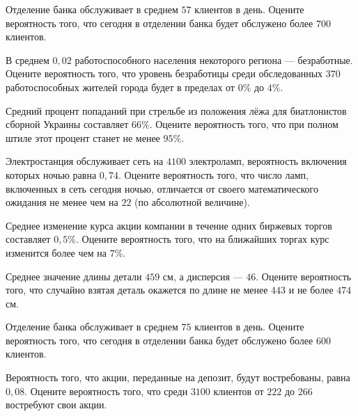 

\z Отделение банка обслуживает в среднем $ 57 $ клиентов в день. Оцените вероятность того, что сегодня в отделении банка будет обслужено более $ 700 $ клиентов.


\vfill

\z В среднем $ 0{,}02 $ работоспособного населения некоторого региона --- безработные. Оцените вероятность того, что уровень безработицы среди обследованных $ 370 $ работоспособных жителей города будет в пределах от $ 0 \%$ до $ 4 \%$.
 

\vfill

\newpage\setcounter{zad}{0}

\z Средний процент попаданий при стрельбе из положения лёжа для биатлонистов сборной Украины составляет $ 66 \% $. Оцените вероятность того, что при полном штиле этот процент станет не менее $ 95 \% $.


\vfill

\z Электростанция обслуживает сеть на $ 4100 $ электроламп, вероятность включения которых ночью равна $ 0{,}74 $. Оцените вероятность того, что число ламп, включенных в сеть сегодня ночью, отличается от своего математического ожидания не менее чем на $ 22 $ (по абсолютной величине). 
 

\vfill

\newpage\setcounter{zad}{0}

\z Среднее изменение курса акции компании в течение одних биржевых торгов составляет $ 0{,}5 \% $. Оцените вероятность того, что на ближайших торгах курс изменится более чем на $ 7 \% $.


\vfill

\z Среднее значение длины детали $ 459 $ см, а дисперсия --- $ 46 $. Оцените вероятность того, что случайно взятая деталь окажется по длине не менее $ 443 $ и не более $ 474 $ см.
 

\vfill

\newpage\setcounter{zad}{0}

\z Отделение банка обслуживает в среднем $ 75 $ клиентов в день. Оцените вероятность того, что сегодня в отделении банка будет обслужено более $ 600 $ клиентов.


\vfill

\z Вероятность того, что акции, переданные на депозит, будут востребованы, равна $ 0{,}08 $. Оцените вероятность того, что среди $ 3100 $ клиентов от $ 222 $ до $ 266 $ востребуют свои акции.
 

\vfill

\newpage\setcounter{zad}{0}

